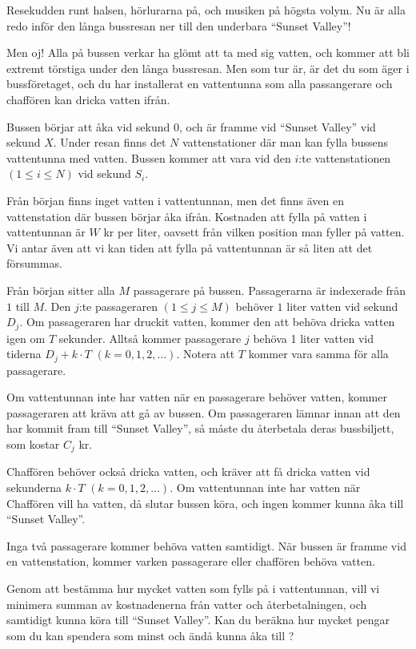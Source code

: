 \noindent
Resekudden runt halsen, hörlurarna på, och musiken på högsta volym. 
Nu är alla redo inför den långa bussresan ner till den underbara ``Sunset Valley''!

Men oj! Alla på bussen verkar ha glömt att ta med sig vatten, 
och kommer att bli extremt törstiga under den långa bussresan.
Men som tur är, är det du som äger i bussföretaget, 
och du har installerat en vattentunna som alla passangerare och chaffören kan dricka vatten ifrån.

Bussen börjar att åka vid sekund $0$, och är framme vid ``Sunset Valley'' vid sekund $X$.
Under resan finns det $N$ vattenstationer där man kan fylla bussens vattentunna med vatten. 
Bussen kommer att vara vid den $i$:te vattenstationen $(1 \leq i \leq N)$ vid sekund $S_i$.

Från början finns inget vatten i vattentunnan, men det finns även en vattenstation där bussen börjar åka ifrån.
Kostnaden att fylla på vatten i vattentunnan är $W$ kr per liter, oavsett från vilken position man fyller på vatten.
Vi antar även att vi kan tiden att fylla på vattentunnan är så liten att det försummas.

Från början sitter alla $M$ passagerare på bussen. Passagerarna är indexerade från $1$ till $M$.
Den $j$:te passageraren $(1 \leq j \leq M)$ behöver $1$ liter vatten vid sekund $D_j$. 
Om passageraren har druckit vatten, kommer den att behöva dricka vatten igen om $T$ sekunder. 
Alltså kommer passagerare $j$ behöva 1 liter vatten vid tiderna $D_j + k\cdot T$ $(k = 0,1,2,\ldots)$.
Notera att $T$ kommer vara samma för alla passagerare.

Om vattentunnan inte har vatten när en passagerare behöver vatten, kommer passageraren att kräva att gå av bussen.
Om passageraren lämnar innan att den har kommit fram till ``Sunset Valley'', så måste du återbetala deras bussbiljett,
som kostar $C_j$ kr.

Chaffören behöver också dricka vatten, och kräver att få dricka vatten vid sekunderna $k\cdot T$ $(k = 0,1,2,\ldots)$. 
Om vattentunnan inte har vatten när Chaffören vill ha vatten, då slutar bussen köra, och ingen kommer kunna åka till ``Sunset Valley''.

Inga två passagerare kommer behöva vatten samtidigt. När bussen är framme vid en vattenstation, kommer varken passagerare eller chaffören behöva vatten.

Genom att bestämma hur mycket vatten som fylls på i vattentunnan, vill vi minimera summan av kostnadenerna från
vatter och återbetalningen, och samtidigt kunna köra till ``Sunset Valley''. Kan du beräkna hur mycket pengar som du kan spendera som minst och ändå kunna åka till ?

